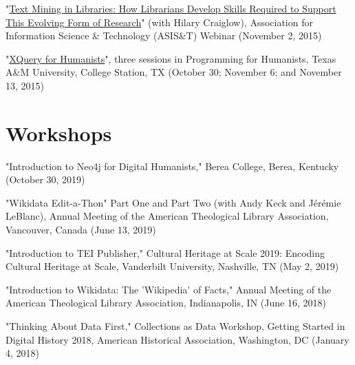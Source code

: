 \documentclass[10pt]{res} %
\begin{document}
\begin{resume}
\begin{hangparas}{.25in}{1}"\href{https://www.asist.org/events/webinars/text-mining-in-libraries/}{Text Mining in Libraries: How Librarians Develop Skills Required to Support This Evolving Form of Research}" (with Hilary Craiglow), Association for Information Science \& Technology (ASIS\&T) Webinar (November 2, 2015)\end{hangparas}

\begin{hangparas}{.25in}{1}"\href{http://programming4humanists.tamu.edu/syllabus-fall-2015/}{XQuery for Humanists}", three sessions in Programming for Humanists, Texas A\&M University, College Station, TX (October 30; November 6; and November 13, 2015)\end{hangparas}

\section{Workshops}

\begin{hangparas}{.25in}{1}"Introduction to Neo4j for Digital Humanists," Berea College, Berea, Kentucky (October 30, 2019)\end{hangparas}

\begin{hangparas}{.25in}{1}"Wikidata Edit-a-Thon" Part One and Part Two (with Andy Keck and Jérémie LeBlanc), Annual Meeting of the American Theological Library Association, Vancouver, Canada (June 13, 2019)\end{hangparas}

\begin{hangparas}{.25in}{1}"Introduction to TEI Publisher," Cultural Heritage at Scale 2019: Encoding Cultural Heritage at Scale, Vanderbilt University, Nashville, TN (May 2, 2019)\end{hangparas}

\begin{hangparas}{.25in}{1}"Introduction to Wikidata: The 'Wikipedia' of Facts," Annual Meeting of the American Theological Library Association, Indianapolis, IN (June 16, 2018)\end{hangparas}

\begin{hangparas}{.25in}{1}"Thinking About Data First," Collections as Data Workshop, Getting Started in Digital History 2018, American Historical Association, Washington, DC (January 4, 2018)\end{hangparas}


\end{resume}
\end{document}
